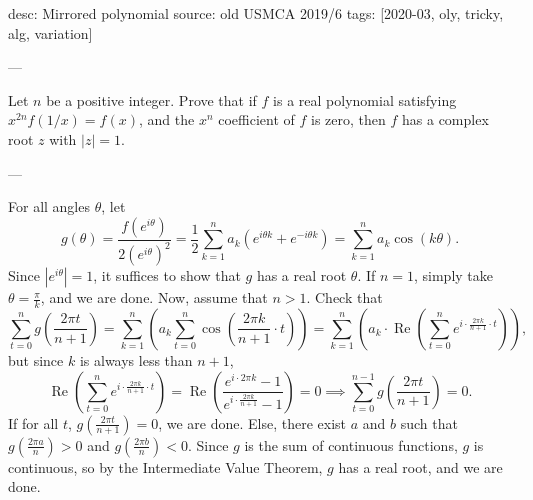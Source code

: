 desc: Mirrored polynomial
source: old USMCA 2019/6
tags: [2020-03, oly, tricky, alg, variation]

---

Let $n$ be a positive integer. Prove that if $f$ is a real polynomial satisfying $x^{2n}f(1/x)=f(x)$, and the $x^n$ coefficient of $f$ is zero, then $f$ has a complex root $z$ with $|z|=1$.

---

For all angles $\theta$, let \[g(\theta)=\frac{f(e^{i\theta})}{2(e^{i\theta})^2}=\frac12\sum_{k=1}^na_k\left(e^{i\theta k}+e^{-i\theta k}\right)=\sum_{k=1}^na_k\cos(k\theta).\]
Since $|e^{i\theta}|=1$, it suffices to show that $g$ has a real root $\theta$. If $n=1$, simply take $\theta=\tfrac\pi k$, and we are done. Now, assume that $n>1$. Check that \[\sum_{t=0}^ng\left(\frac{2\pi t}{n+1}\right)=\sum_{k=1}^n \left(a_k\sum_{t=0}^n\cos\left(\frac{2\pi k}{n+1}\cdot t\right)\right)=\sum_{k=1}^n\left(a_k\cdot\operatorname{Re}\left(\sum_{t=0}^ne^{i\cdot \frac{2\pi k}{n+1}\cdot t}\right)\right),\]
but since $k$ is always less than $n+1$, \[\operatorname{Re}\left(\sum_{t=0}^ne^{i\cdot \frac{2\pi k}{n+1}\cdot t}\right)=\operatorname{Re}\left(\frac{e^{i\cdot 2\pi k}-1}{e^{i\cdot\frac{2\pi k}{n+1}}-1}\right)=0\implies\sum_{t=0}^{n-1}g\left(\frac{2\pi t}{n+1}\right)=0.\]
If for all $t$, $g(\tfrac{2\pi t}{n+1})=0$, we are done. Else, there exist $a$ and $b$ such that $g(\tfrac{2\pi a}n)>0$ and $g(\tfrac{2\pi b}n)<0$. Since $g$ is the sum of continuous functions, $g$ is continuous, so by the Intermediate Value Theorem, $g$ has a real root, and we are done.
